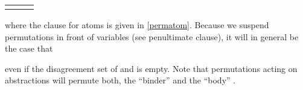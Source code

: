 \begin{isabellebody}
\begin{isamarkuptext}
\begin{center}
\begin{tabular}{rcl}
  \isa{{\isaliteral{5C3C70693E}{\isasympi}}\ {\isaliteral{5C3C62756C6C65743E}{\isasymbullet}}\ {\isaliteral{28}{\isacharparenleft}}a{\isaliteral{2E}{\isachardot}}\ t{\isaliteral{29}{\isacharparenright}}} & \isa{{\isaliteral{5C3C65717569763E}{\isasymequiv}}} & \isa{{\isaliteral{28}{\isacharparenleft}}{\isaliteral{5C3C70693E}{\isasympi}}\ {\isaliteral{5C3C62756C6C65743E}{\isasymbullet}}\ a{\isaliteral{29}{\isacharparenright}}{\isaliteral{2E}{\isachardot}}\ {\isaliteral{28}{\isacharparenleft}}{\isaliteral{5C3C70693E}{\isasympi}}\ {\isaliteral{5C3C62756C6C65743E}{\isasymbullet}}\ t{\isaliteral{29}{\isacharparenright}}}\\  
  \end{tabular}
  \end{center}
  
  \noindent
  where the clause for atoms is given in \eqref{permatom}. Because we suspend permutations
  in front of variables (see penultimate clause), it will in general be the case that
  
  

  \noindent 
  even if the disagreement set of  and  is empty. Note
  that permutations acting on abstractions will permute both, the ``binder'' 
  and the ``body'' .

  \begin{figure}[t]
  \begin{center}
  \begin{tabular}{c}


\end{tabular}
\end{center}
\end{figure}
\end{isamarkuptext}
\end{isabellebody}
